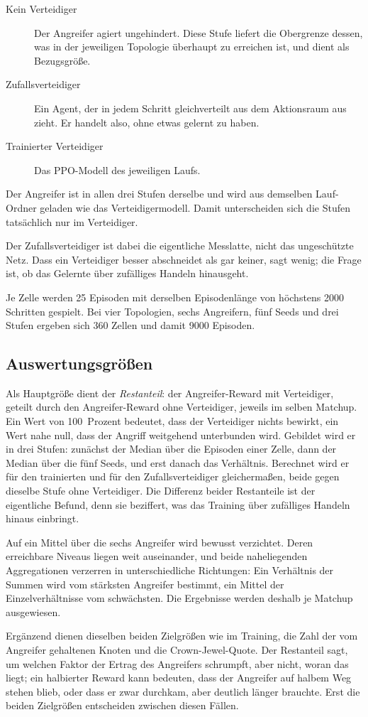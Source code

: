\begin{description}
  \item[Kein Verteidiger] Der Angreifer agiert ungehindert. Diese Stufe liefert
    die Obergrenze dessen, was in der jeweiligen Topologie überhaupt zu
    erreichen ist, und dient als Bezugsgröße.
  \item[Zufallsverteidiger] Ein Agent, der in jedem Schritt gleichverteilt aus
    dem Aktionsraum aus  zieht. Er handelt also,
    ohne etwas gelernt zu haben.
  \item[Trainierter Verteidiger] Das \ac{PPO}-Modell des jeweiligen Laufs.
\end{description}

Der Angreifer ist in allen drei Stufen derselbe und wird aus demselben
Lauf-Ordner geladen wie das Verteidigermodell. Damit unterscheiden sich die
Stufen tatsächlich nur im Verteidiger.

Der Zufallsverteidiger ist dabei die eigentliche Messlatte, nicht das
ungeschützte Netz. Dass ein Verteidiger besser abschneidet als gar keiner,
sagt wenig; die Frage ist, ob das Gelernte über zufälliges Handeln hinausgeht.

Je Zelle werden \num{25} Episoden mit derselben Episodenlänge von höchstens
\num{2000} Schritten gespielt. Bei vier Topologien, sechs Angreifern, fünf
Seeds und drei Stufen ergeben sich \num{360} Zellen und damit \num{9000}
Episoden.

\subsection{Auswertungsgrößen}

Als Hauptgröße dient der \emph{Restanteil}: der Angreifer-Reward mit
Verteidiger, geteilt durch den Angreifer-Reward ohne Verteidiger, jeweils im
selben Matchup. Ein Wert von 100~Prozent bedeutet, dass der Verteidiger nichts
bewirkt, ein Wert nahe null, dass der Angriff weitgehend unterbunden wird.
Gebildet wird er in drei Stufen: zunächst der Median über die Episoden einer
Zelle, dann der Median über die fünf Seeds, und erst danach das Verhältnis.
Berechnet wird er für den trainierten und für den Zufallsverteidiger
gleichermaßen, beide gegen dieselbe Stufe ohne Verteidiger. Die Differenz
beider Restanteile ist der eigentliche Befund, denn sie beziffert, was das
Training über zufälliges Handeln hinaus einbringt.

Auf ein Mittel über die sechs Angreifer wird bewusst verzichtet. Deren
erreichbare Niveaus liegen weit auseinander, und beide naheliegenden
Aggregationen verzerren in unterschiedliche Richtungen: Ein Verhältnis der
Summen wird vom stärksten Angreifer bestimmt, ein Mittel der Einzelverhältnisse
vom schwächsten. Die Ergebnisse werden deshalb je Matchup ausgewiesen.

Ergänzend dienen dieselben beiden Zielgrößen wie im Training, die Zahl der vom
Angreifer gehaltenen Knoten und die Crown-Jewel-Quote. Der Restanteil sagt, um
welchen Faktor der Ertrag des Angreifers schrumpft, aber nicht, woran das
liegt; ein halbierter Reward kann bedeuten, dass der Angreifer auf halbem Weg
stehen blieb, oder dass er zwar durchkam, aber deutlich länger brauchte. Erst
die beiden Zielgrößen entscheiden zwischen diesen Fällen.
